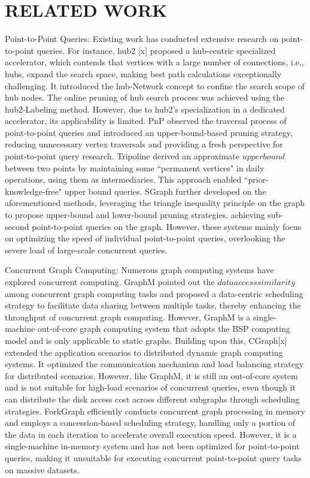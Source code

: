 \documentclass[lettersize,journal]{IEEEtran} %
\begin{document}
\section{RELATED WORK}
Point-to-Point Queries: Existing work has conducted extensive research on point-to-point queries. For instance, hub2 [x] proposed a hub-centric specialized accelerator, which contends that vertices with a large number of connections, i.e., hubs, expand the search space, making best path calculations exceptionally challenging. It introduced the hub-Network concept to confine the search scope of hub nodes. The online pruning of hub search process was achieved using the hub2-Labeling method. However, due to hub2's specialization in a dedicated accelerator, its applicability is limited. PnP observed the traversal process of point-to-point queries and introduced an upper-bound-based pruning strategy, reducing unnecessary vertex traversals and providing a fresh perspective for point-to-point query research. Tripoline derived an approximate $upper bound$ between two points by maintaining some \textquotedblleft permanent vertices" in daily operations, using them as intermediaries. This approach enabled \textquotedblleft prior-knowledge-free" upper bound queries. SGraph further developed on the aforementioned methods, leveraging the triangle inequality principle on the graph to propose upper-bound and lower-bound pruning strategies, achieving sub-second point-to-point queries on the graph. However, these systems mainly focus on optimizing the speed of individual point-to-point queries, overlooking the severe load of large-scale concurrent queries.

Concurrent Graph Computing: Numerous graph computing systems have explored concurrent computing. GraphM pointed out the $data access similarity$ among concurrent graph computing tasks and proposed a data-centric scheduling strategy to facilitate data sharing between multiple tasks, thereby enhancing the throughput of concurrent graph computing. However, GraphM is a single-machine out-of-core graph computing system that adopts the BSP computing model and is only applicable to static graphs. Building upon this, CGraph[x] extended the application scenarios to distributed dynamic graph computing systems. It optimized the communication mechanism and load balancing strategy for distributed scenarios. However, like GraphM, it is still an out-of-core system and is not suitable for high-load scenarios of concurrent queries, even though it can distribute the disk access cost across different subgraphs through scheduling strategies. ForkGraph efficiently conducts concurrent graph processing in memory and employs a concession-based scheduling strategy, handling only a portion of the data in each iteration to accelerate overall execution speed. However, it is a single-machine in-memory system and has not been optimized for point-to-point queries, making it unsuitable for executing concurrent point-to-point query tasks on massive datasets.
\end{document}
